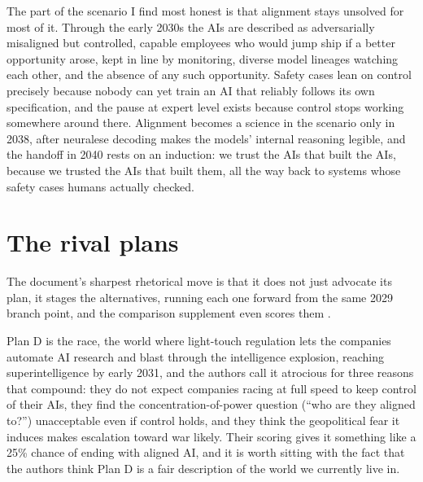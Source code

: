 \documentclass[11pt,letterpaper]{article}
\begin{document}
The part of the scenario I find most honest is that alignment stays unsolved for most of it. Through the early 2030s the AIs are described as adversarially misaligned but controlled, capable employees who would jump ship if a better opportunity arose, kept in line by monitoring, diverse model lineages watching each other, and the absence of any such opportunity. Safety cases lean on control precisely because nobody can yet train an AI that reliably follows its own specification, and the pause at expert level exists because control stops working somewhere around there. Alignment becomes a science in the scenario only in 2038, after neuralese decoding makes the models' internal reasoning legible, and the handoff in 2040 rests on an induction: we trust the AIs that built the AIs, because we trusted the AIs that built them, all the way back to systems whose safety cases humans actually checked.

\section{The rival plans}

The document's sharpest rhetorical move is that it does not just advocate its plan, it stages the alternatives, running each one forward from the same 2029 branch point, and the comparison supplement even scores them \citep{supplements}.

Plan D is the race, the world where light-touch regulation lets the companies automate AI research and blast through the intelligence explosion, reaching superintelligence by early 2031, and the authors call it atrocious for three reasons that compound: they do not expect companies racing at full speed to keep control of their AIs, they find the concentration-of-power question (``who are they aligned to?'') unacceptable even if control holds, and they think the geopolitical fear it induces makes escalation toward war likely. Their scoring gives it something like a 25\% chance of ending with aligned AI, and it is worth sitting with the fact that the authors think Plan D is a fair description of the world we currently live in.
\end{document}
